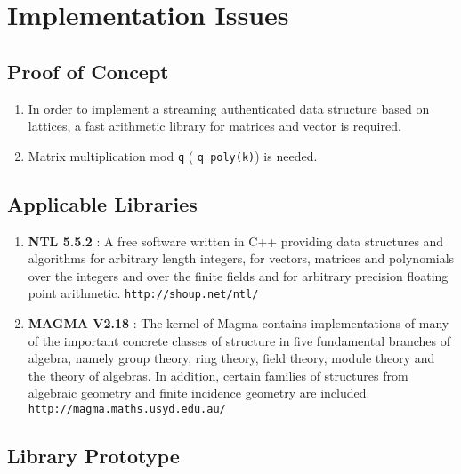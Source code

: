 \documentclass[11pt, letterpaper, oneside]{article}
\begin{document}


\section{Implementation Issues\\}
\subsection{Proof of Concept}
	\begin{enumerate}
	\item In order to implement a streaming authenticated data structure based on lattices, a fast
	arithmetic library for matrices and vector is required.
	\item Matrix multiplication mod \texttt{q} ( \texttt{q poly(k)}) is needed.
	\end{enumerate}

\subsection{Applicable Libraries\\}
	\begin{enumerate}
	\item \textbf{NTL 5.5.2} : A free software written in C++ providing data structures and algorithms for arbitrary length
	integers, for vectors, matrices and polynomials over the integers and over the finite fields and for 
	arbitrary precision floating point arithmetic.
	\texttt{http://shoup.net/ntl/}
	\item \textbf{MAGMA V2.18} : The kernel of Magma contains implementations of many of
the important concrete classes of structure in five fundamental branches of algebra, namely group theory, ring theory, field theory, module theory and the theory of algebras.
In addition, certain
families of structures from algebraic geometry and finite incidence geometry are included. \texttt{http://magma.maths.usyd.edu.au/}
	\end{enumerate}

\subsection{ Library Prototype\\}
\end{document}
